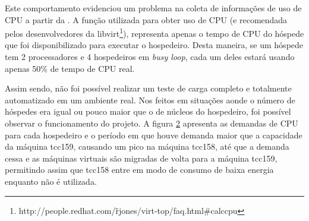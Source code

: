 \begin{figure}[htp]
\centering
{}
\label{fig:cpuhost1}
\end{figure}

Este comportamento evidenciou um problema na coleta de informações de uso de CPU
a partir da \libvirt{}. A função utilizada para obter uso de CPU (e recomendada
pelos desenvolvedores da
libvirt\footnote{http://people.redhat.com/\~rjones/virt-top/faq.html\#calccpu}),
representa apenas o tempo de CPU do hóspede que foi disponibilizado para
executar o hospedeiro. Desta maneira, se um hóspede tem 2 processadores e 4
hospedeiros em \emph{busy loop}, cada um deles estará usando apenas 50\% de
tempo de CPU real.

Assim sendo, não foi possível realizar um teste de carga completo e totalmente
automatizado em um ambiente real. Nos feitos em situações aonde o número de
hóspedes era igual ou pouco maior que o de núcleos do hospedeiro, foi possível
observar o funcionamento do projeto. A figura \ref{fig:cpuhost2} apresenta as
demandas de CPU para cada hospedeiro e o período em que houve demanda maior que
a capacidade da máquina tcc159, causando um pico na máquina tcc158, até que a
demanda cessa e as máquinas virtuais são migradas de volta para a máquina
tcc159, permitindo assim que tcc158 entre em modo de consumo de baixa energia
enquanto não é utilizada.

\begin{figure}[htp]
\centering
{}
\label{fig:cpuhost2}
\end{figure}

